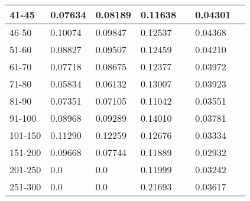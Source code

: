 \begin{table*}[h!]
\begin{tabular}{|l|l|l||l|l||l|l|}
        41-45     & 0.07634                                 & 0.08189                               & 0.11638                          &                  & 0.04301       &                  \\ \hline
        46-50     & 0.10074                                 & 0.09847                               & 0.12537                          &                  & 0.04368       &                  \\ \hline
        51-60     & 0.08827                                 & 0.09507                               & 0.12459                          &                  & 0.04210       &                  \\ \hline
        61-70     & 0.07718                                 & 0.08675                               & 0.12377                          &                  & 0.03972       &                  \\ \hline
        71-80     & 0.05834                                 & 0.06132                               & 0.13007                          &                  & 0.03923       &                  \\ \hline
        81-90     & 0.07351                                 & 0.07105                               & 0.11042                          &                  & 0.03551       &                  \\ \hline
        91-100    & 0.08968                                 & 0.09289                               & 0.14010                          &                  & 0.03781       &                  \\ \hline
        101-150   & 0.11290                                 & 0.12259                               & 0.12676                          &                  & 0.03334       &                  \\ \hline
        151-200   & 0.09668                                 & 0.07744                               & 0.11889                          &                  & 0.02932       &                  \\ \hline
        201-250   & 0.0                                     & 0.0                                   & 0.11999                          &                  & 0.03242       &                  \\ \hline
        251-300   & 0.0                                     & 0.0                                   & 0.21693                          &                  & 0.03617       &                  \\ \hline

\end{tabular}
\end{table*}

